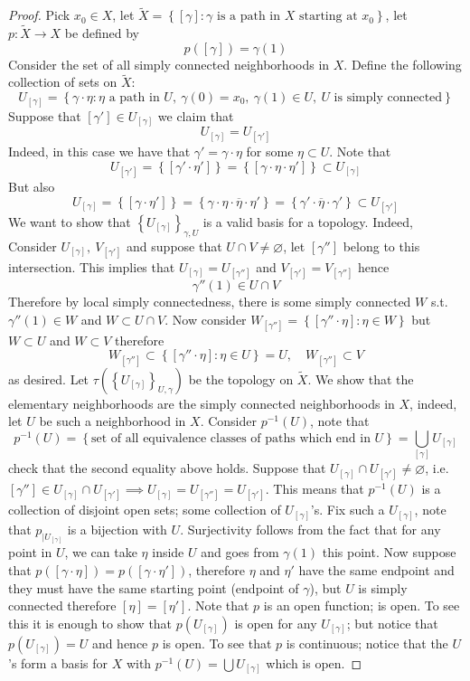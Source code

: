 \documentclass[11pt,a4paper]{article}
\theoremstyle{definition}
\theoremstyle{plain}
\theoremstyle{remark}
\renewcommand{\set}[1]{\left\{ #1 \right\}}
\newcommand{\1}{\mathbbm{1}}
\begin{document}
\begin{proof}
    Pick $x_0 \in X$, let $\tilde{X} = \set{[\gamma] \colon \gamma \text{ is a path in $X$ starting at $x_0$}}$, let 
    $p \colon \tilde{X} \to X$ be defined by 
    $$p([\gamma]) = \gamma(1)$$
    Consider the set of all simply connected neighborhoods in $X$. Define the following collection of sets on $\tilde{X}$:
    $$U_{[\gamma]} = \set{\gamma \cdot \eta \colon \eta \text{ a path in $U$}, \ \gamma(0) = x_0, \ \gamma(1) \in U, \ U \text{ is simply connected}}$$
    Suppose that $[\gamma'] \in U_{[\gamma]}$ we claim that 
    $$U_{[\gamma]} = U_{[\gamma']}$$
    Indeed, in this case we have that $\gamma' = \gamma \cdot \eta$ for some $\eta \subset U$. 
    Note that 
    $$U_{[\gamma']} = \set{[\gamma' \cdot \eta']} = \set{[\gamma \cdot \eta \cdot \eta']} \subset U_{[\gamma]}$$
    But also 
    $$U_{[\gamma]} = \set{[\gamma \cdot \eta']} = \set{\gamma \cdot \eta \cdot \overline{\eta} \cdot \eta'} = \set{\gamma' \cdot \overline{\eta} \cdot \gamma'} \subset U_[\gamma']$$
    We want to show that $\set{U_{[\gamma]}}_{\gamma, U}$ is a valid basis for a topology. Indeed, Consider $U_[\gamma], \ V_[\gamma']$ and suppose that 
    $U \cap V \ne \varnothing$, let $[\gamma'']$ belong to this intersection. This implies that $U_{[\gamma]} = U_{[\gamma'']}$ and $V_{[\gamma']} = V_{[\gamma'']}$ 
    hence 
    $$\gamma''(1) \in U \cap V$$
    Therefore by local simply connectedness, there is some simply connected $W$ s.t. $\gamma''(1) \in W$ and $W \subset U \cap V$. Now consider 
    $W_{[\gamma'']} = \set{[\gamma'' \cdot \eta] \colon \eta \in W}$ but $W \subset U$ and $W \subset V$ therefore 
    $$W_{[\gamma'']} \subset \set{[\gamma'' \cdot \eta] \colon \eta \in U} = U, \quad W_{[\gamma'']} \subset V$$
    as desired.
    Let $\tau \left(\set{U_{[\gamma]}}_{U, \gamma}\right)$ be the topology on $\tilde{X}$. We show that the elementary neighborhoods are the simply connected neighborhoods in $X$, 
    indeed, let $U$ be such a neighborhood in $X$. Consider $p^{-1}(U)$, note that 
    $$p^{-1}(U) = \set{\text{set of all equivalence classes of paths which end in $U$}} = \bigcup_{[\gamma]} U_{[\gamma]}$$
    check that the second equality above holds. Suppose that $U_{[\gamma]} \cap U_{[\gamma']} \ne \varnothing$, i.e. 
    $[\gamma''] \in U_{[\gamma]} \cap U_{[\gamma']} \implies U_{[\gamma]} = U_{[\gamma'']} = U_{[\gamma']}$. This means that $p^{-1}(U)$ is a collection 
    of disjoint open sets; some collection of $U_{[\gamma]}$'s. Fix such a $U_{[\gamma]}$, note that $p_{|U_{[\gamma]}}$ is a bijection with $U$.
    Surjectivity follows from the fact that for any point in $U$, we can take $\eta$ inside $U$ and goes from $\gamma(1)$ this point. Now suppose that 
    $p([\gamma \cdot \eta]) = p([\gamma \cdot \eta'])$, therefore $\eta$ and $\eta'$ have the same endpoint and 
    they must have the same starting point (endpoint of $\gamma$), but $U$ is simply connected therefore $[\eta] = [\eta']$. Note that $p$ is an open function; 
    is open. To see this it is enough to show that $p(U_{[\gamma]})$ is open for any $U_{[\gamma]}$; but notice that 
    $p(U_{[\gamma]}) = U$ and hence $p$ is open. To see that $p$ is continuous; notice that the $U$'s form a basis for $X$ with 
    $p^{-1}(U) = \bigcup U_{[\gamma]}$ which is open. 


\end{proof}
\end{document}
